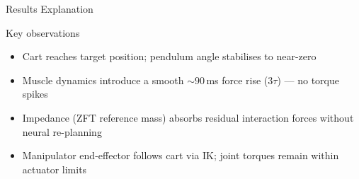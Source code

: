 \documentclass[aspectratio=169,10pt]{beamer}
\begin{document}
\begin{frame}{Results Explanation}
    \begin{block}{Key observations}
  \begin{itemize}\setlength\itemsep{1pt}
    \item Cart reaches target position; pendulum angle stabilises to near-zero
    \item Muscle dynamics introduce a smooth ${\sim}90\,$ms force rise (3$\tau$) --- no torque spikes
    \item Impedance (ZFT reference mass) absorbs residual interaction forces without neural re-planning
    \item Manipulator end-effector follows cart via IK; joint torques remain within actuator limits
  \end{itemize}
\end{block}
\end{frame}
\end{document}

